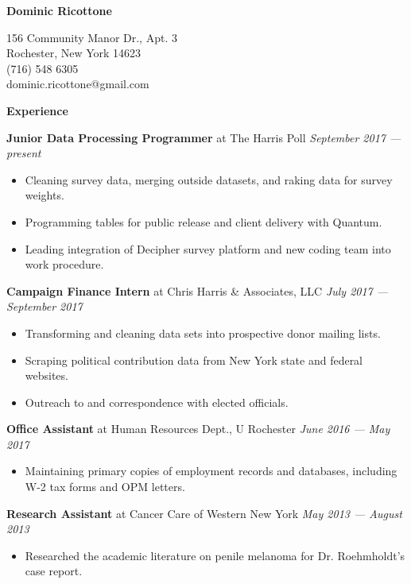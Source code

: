 \documentclass[12pt]{article}
\newenvironment{details}{
\begin{itemize}[label={}]
	\small \setlength{\itemsep}{0pt}
}{\end{itemize}}
\begin{document}
\centering \Huge
\textbf{Dominic Ricottone}

\footnotesize
\begin{multicols}{2}
156 Community Manor Dr., Apt. 3 \\
Rochester, New York 14623 \\
(716) 548 6305 \\
dominic.ricottone@gmail.com
\end{multicols}

\large
\textbf{Experience} \hrulefill

\vspace{.1in}
\normalsize
\textbf{Junior Data Processing Programmer} at The Harris Poll \hfill \textit{September 2017 --- present}
\begin{details}
 	\item Cleaning survey data, merging outside datasets, and raking data for survey weights.
	\item Programming tables for public release and client delivery with Quantum.
	\item Leading integration of Decipher survey platform and new coding team into work procedure.
\end{details}

\vspace{.1in}
\normalsize
\textbf{Campaign Finance Intern} at Chris Harris \& Associates, LLC \hfill \textit{July 2017 --- September 2017}
\begin{details}
	\item Transforming and cleaning data sets into prospective donor mailing lists.
	\item Scraping political contribution data from New York state and federal websites.
	\item Outreach to and correspondence with elected officials.
\end{details}

\vspace{.1in}
\normalsize
\textbf{Office Assistant} at Human Resources Dept., U Rochester  \hfill \textit{June 2016 --- May 2017}
\begin{details}
	\item Maintaining primary copies of employment records and databases, including W-2 tax forms and OPM letters.
\end{details}

\vspace{.1in}
\normalsize
\textbf{Research Assistant} at Cancer Care of Western New York  \hfill \textit{May 2013 --- August 2013}
\begin{details}
	\item Researched the academic literature on penile melanoma for Dr. Roehmholdt's case report.
\end{details}
\end{document}
